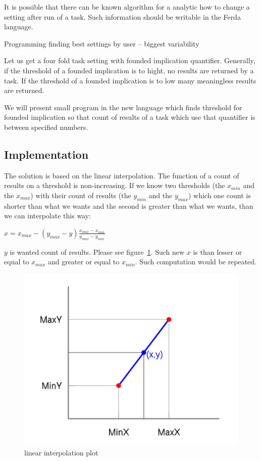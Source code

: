 \documentclass[a4paper,12pt]{book}
\begin{document}
It is possible that there can be known algorithm for a analytic how to change a setting after run of a task. Such information should be writable in the Ferda language.

Programming finding best settings by user -- biggest variability

Let us get a four fold task setting with founded implication quantifier. Generally, if the threshold of a founded implication is to hight, no results are returned by a task. If the threshold of a founded implication is to low many meaningless results are returned.

We will present small program in the new language which finds threshold for founded implication so that count of results of a task which use that quantifier is between specified numbers.

\subsection{Implementation}
The solution is based on the linear interpolation. The function of a count of results on a threshold is non-increasing. If we know two thresholds (the $x_{min}$ and the $x_{max}$) with their count of results (the $y_{min}$ and the $y_{max}$) which one count is shorter than what we wants and the second is greater than what we wants, than we can interpolate this way: 

\begin{math}
x = x_{max} - (y_{max} - y)\frac{x_{max} - x_{min}}{y_{max} - y_{min}}
\end{math}

$y$ is wanted count of results. Please see figure~\ref{fig:linearInterpolationPlot}. Such new $x$ is than lesser or equal to $x_{max}$ and greater or equal to $x_{min}$. Such computation would be repeated.

\begin{figure}
	\includegraphics[width=1\textwidth]{linearInterpolationPlot}
	\caption{linear interpolation plot}
	\label{fig:linearInterpolationPlot}
\end{figure}
\end{document}
